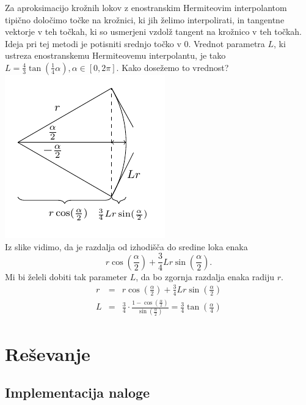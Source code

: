 \documentclass[a4paper,12pt]{article}
\begin{document}
	Za aproksimacijo krožnih lokov z enostranskim Hermiteovim interpolantom tipično določimo točke na krožnici, ki jih želimo interpolirati, 
	in tangentne vektorje v teh točkah, ki so usmerjeni vzdolž tangent na krožnico v teh točkah. Ideja pri tej metodi je potisniti srednjo točko v $0$. 
	Vrednot parametra $L$, ki ustreza enostranskemu Hermiteovemu interpolantu, je tako $L = \frac{4}{3} \tan(\frac{1}{4}\alpha), \alpha \in [0,2\pi]$.
	Kako dosežemo to vrednost? \\
	\noindent\hspace*{10em}
	\includegraphics[scale=1.5]{slika.pdf} 
	\\
	Iz slike vidimo, da je razdalja od izhodišča do sredine loka enaka 
	$$r\cos(\frac{\alpha}{2}) + \frac{3}{4}Lr\sin(\frac{\alpha}{2}).$$
	Mi bi želeli dobiti tak parameter $L$, da bo zgornja razdalja enaka radiju $r$.
	\begin{eqnarray*}
		r &=& r\cos(\frac{\alpha}{2}) + \frac{3}{4}Lr\sin(\frac{\alpha}{2})\\
		L &=& \frac{3}{4} \cdot \frac{1-\cos(\frac{\alpha}{2})}{\sin(\frac{\alpha}{2})} = \frac{3}{4}\tan(\frac{\alpha}{4})
	\end{eqnarray*}
	
	\section{Reševanje}
	\subsection{Implementacija naloge}
	
\end{document}
